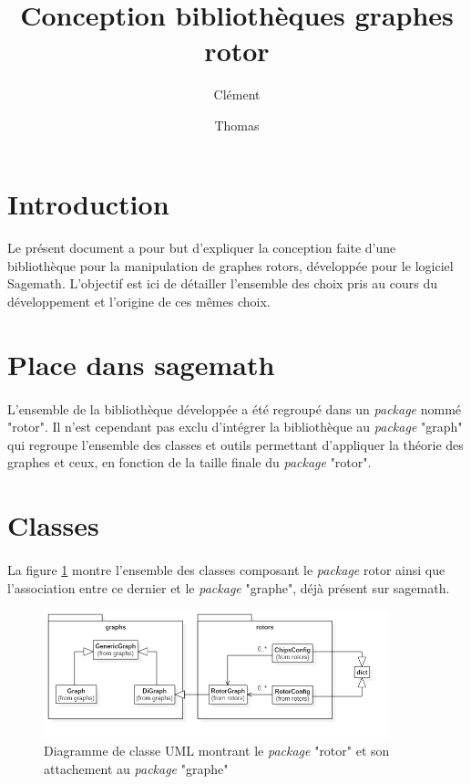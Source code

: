 \documentclass{article}
\title{Conception bibliothèques graphes rotor}
\author{Clément \bsc{Chrétien} \and Thomas \bsc{Petiteau}}
\begin{document}
	\maketitle
	\clearpage
	
	\tableofcontents
	\clearpage

	\section{Introduction}
		\paragraph*{}
		Le présent document a pour but d'expliquer la conception faite d'une bibliothèque pour la manipulation de graphes rotors, développée pour le logiciel Sagemath. L'objectif est ici de détailler l'ensemble des choix pris au cours du développement et l'origine de ces mêmes choix.
	
	\section{Place dans sagemath}
		\paragraph*{}
		L'ensemble de la bibliothèque développée a été regroupé dans un \textit{package} nommé "rotor". Il n'est cependant pas exclu d'intégrer la bibliothèque au \textit{package} "graph" qui regroupe l'ensemble des classes et outils permettant d'appliquer la théorie des graphes et ceux, en fonction de la taille finale du \textit{package} "rotor".
	
	\section{Classes}
		\paragraph*{}
		La figure \ref{fig:diagClassGlobal} montre l'ensemble des classes composant le \textit{package} rotor ainsi que l'association entre ce dernier et le \textit{package} "graphe", déjà présent sur sagemath.
		
		\begin{figure}[h]
			\includegraphics[width=10cm]{diagClassGlobal.png}
			\centering
			\caption{Diagramme de classe UML montrant le \textit{package} "rotor" et son attachement au \textit{package} "graphe"}
			\label{fig:diagClassGlobal}
		\end{figure}
	
\end{document}
